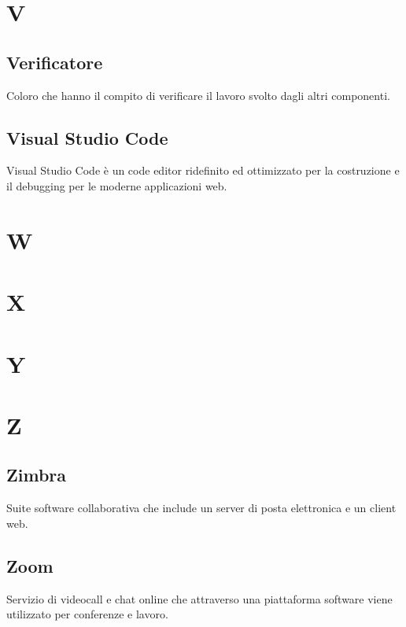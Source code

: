 \newpage
\section{V}
\subsection*{Verificatore}
Coloro che hanno il compito di verificare il lavoro svolto dagli altri componenti.

\subsection*{Visual Studio Code}
Visual Studio Code è un code editor ridefinito ed ottimizzato per la costruzione e il debugging per le moderne applicazioni web.

\newpage
\section{W}


\newpage
\section{X}


\newpage
\section{Y}


\newpage
\section{Z}
\subsection*{Zimbra}
Suite software collaborativa che include un server di posta elettronica e un client web.

\subsection*{Zoom}
Servizio di videocall e chat online che attraverso una piattaforma software viene utilizzato per conferenze e lavoro.
